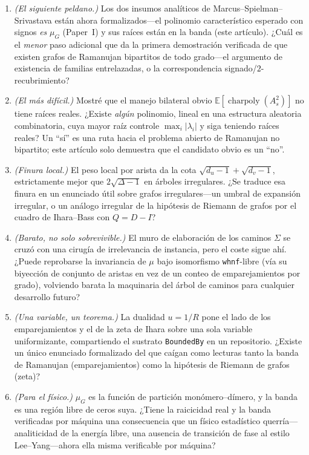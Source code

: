 \documentclass[11pt]{article}
\newcommand{\lean}[1]{{\def\_{\textunderscore\allowbreak}\texttt{#1}}}
\begin{document}
\begin{enumerate}\itemsep3pt
\item[\textbf{P1}] \emph{(El siguiente peldano.)} Los dos insumos anal\'iticos de
  Marcus--Spielman--Srivastava est\'an ahora formalizados---el polinomio
  caracter\'istico esperado con signos \emph{es} $\mu_G$ (Paper~I) y sus ra\'ices
  est\'an en la banda (este art\'iculo). ¿Cu\'al es el \emph{menor} paso adicional
  que da la primera demostraci\'on verificada de que existen grafos de Ramanujan
  bipartitos de todo grado---el argumento de existencia de familias entrelazadas, o
  la correspondencia signado/$2$-recubrimiento?
\item[\textbf{P2}] \emph{(El m\'as dif\'icil.)} Mostr\'e que el manejo bilateral
  obvio $\mathbb{E}[\operatorname{charpoly}(A_s^2)]$ no tiene ra\'ices reales.
  ¿Existe \emph{alg\'un} polinomio, lineal en una estructura aleatoria
  combinatoria, cuya mayor ra\'iz controle $\max_i|\lambda_i|$ y siga teniendo
  ra\'ices reales? Un ``s\'i'' es una ruta hacia el problema abierto de Ramanujan no
  bipartito; este art\'iculo solo demuestra que el candidato obvio es un ``no''.
\item[\textbf{P3}] \emph{(Finura local.)} El peso local por arista da la cota
  $\sqrt{d_u-1}+\sqrt{d_v-1}$, estrictamente mejor que $2\sqrt{\Delta-1}$ en
  \'arboles irregulares. ¿Se traduce esa finura en un enunciado \'util sobre grafos
  irregulares---un umbral de expansi\'on irregular, o un an\'alogo irregular de la
  hip\'otesis de Riemann de grafos por el cuadro de Ihara--Bass con $Q=D-I$?
\item[\textbf{P4}] \emph{(Barato, no solo sobrevivible.)} El muro de elaboraci\'on de
  los caminos $\Sigma$ se cruz\'o con una cirug\'ia de irrelevancia de instancia,
  pero el coste sigue ah\'i. ¿Puede reprobarse la invariancia de $\mu$ bajo
  isomorfismo \lean{whnf}-libre (v\'ia su biyecci\'on de conjunto de aristas en vez
  de un conteo de emparejamientos por grado), volviendo barata la maquinaria del
  \'arbol de caminos para cualquier desarrollo futuro?
\item[\textbf{P5}] \emph{(Una variable, un teorema.)} La dualidad $u=1/R$ pone el
  lado de los emparejamientos y el de la zeta de Ihara sobre una sola variable
  uniformizante, compartiendo el sustrato \lean{BoundedBy} en un repositorio.
  ¿Existe un \'unico enunciado formalizado del que ca\'igan como lecturas tanto la
  banda de Ramanujan (emparejamientos) como la hip\'otesis de Riemann de grafos
  (zeta)?
\item[\textbf{P6}] \emph{(Para el f\'isico.)} $\mu_G$ es la funci\'on de partici\'on
  mon\'omero--d\'imero, y la banda es una regi\'on libre de ceros suya. ¿Tiene la
  raicicidad real y la banda verificadas por m\'aquina una consecuencia que un
  f\'isico estad\'istico querr\'ia---analiticidad de la energ\'ia libre, una
  ausencia de transici\'on de fase al estilo Lee--Yang---ahora ella misma
  verificable por m\'aquina?
\end{enumerate}
\end{document}

